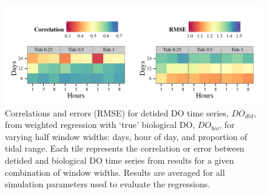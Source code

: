 \documentclass[letterpaper,12pt,oneside]{article}\usepackage[]{graphicx}\usepackage[]{color}
\makeatletter
\def\maxwidth{ %
  \ifdim\Gin@nat@width>\linewidth
    \linewidth
  \else
    \Gin@nat@width
  \fi
}
\newenvironment{knitrout}{}{} %
\makeatother
\begin{document}
\centering\vspace*{\fill}
\begin{knitrout}
\color{fgcolor}\begin{figure}[!ht]


{\centering \includegraphics[width=\maxwidth]{figure/err_surf2} 

}

\caption[Correlations and errors (\ac{RMSE}) for detided \ac{DO} time series, $DO_{dtd}$, from weighted regression with `true' biological \ac{DO}, $DO_{bio}$, for varying half window widths]{Correlations and errors (\ac{RMSE}) for detided \ac{DO} time series, $DO_{dtd}$, from weighted regression with `true' biological \ac{DO}, $DO_{bio}$, for varying half window widths: days, hour of day, and proportion of tidal range.  Each tile represents the correlation or error between detided and biological \ac{DO} time series from results for a given combination of window widths.  Results are averaged for all simulation parameters used to evaluate the regressions.\label{fig:err_surf2}}
\end{figure}


\end{knitrout}
\vfill
\clearpage

\centering\vspace*{\fill}

\vfill
\clearpage
\end{document}

